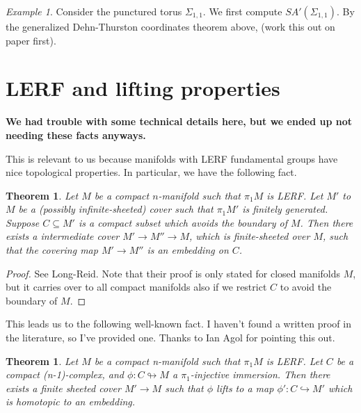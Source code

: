 \documentclass[12pt]{amsart}
\newtheorem{thm}[theorem]{Theorem}
\theoremstyle{definition}
\theoremstyle{remark}
\newtheorem{example}[theorem]{Example}
\newcommand{\Si}{\Sigma}
\newcommand{\cin}{\subseteq}
\begin{document}
{\begin{example}

Consider the punctured torus $\Si_{1,1}$. We first compute $SA'(\Si_{1,1})$.
By the generalized Dehn-Thurston coordinates theorem above, (work this out on
paper first).

\end{example}

\section{LERF and lifting properties}
\textbf{We had trouble with some technical details here, but we ended up not
needing these facts anyways.}

This is relevant to us because manifolds with LERF fundamental groups have nice
topological properties. In particular, we have the following fact.

\begin{thm}

Let $M$ be a compact $n$-manifold such that $\pi_1M$ is LERF. Let $M'$ to $M$
be a (possibly infinite-sheeted) cover such that $\pi_1M'$ is finitely
generated.  Suppose $C \cin M'$ is a compact subset which avoids the boundary
of $M$. Then there exists a intermediate cover $M' \to M'' \to M$, which is
finite-sheeted over $M$, such that the covering map $M' \to M''$ is an
embedding on $C$.

\end{thm}

\begin{proof}

See Long-Reid. Note that their proof is only stated for closed manifolds $M$,
but it carries over to all compact manifolds also if we restrict $C$ to avoid
the boundary of $M$.


\end{proof}

This leads us to the following well-known fact. I haven't found a written proof
in the literature, so I've provided one. Thanks to Ian Agol for pointing this
out.

\begin{thm}

Let $M$ be a compact n-manifold such that $\pi_1M$ is LERF. Let $C$ be
a compact (n-1)-complex, and $\phi \colon C \looparrowright M$
a $\pi_1$-injective immersion.  Then there exists a finite sheeted cover $M'
\to M$ such that $\phi$ lifts to a map $\phi' \colon C \hookrightarrow M'$
which is homotopic to an embedding.


\end{thm}}
\end{document}
